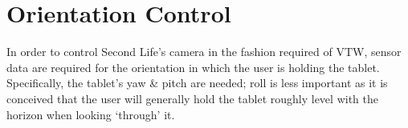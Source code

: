 

\section{Orientation Control}

\label{OrientationControl}

\newcommand{\ArduinoFootnote}{\footnote{\url{http://www.arduino.cc/}}}

\newcommand{\MMAfootnote}{\footnote{\url{http://cache.freescale.com/files/sensors/doc/data_sheet/MMA8452Q.pdf}}}

\newcommand{\ADXLfootnote}{\footnote{\url{http://www.analog.com/static/imported-files/data_sheets/ADXL335.pdf}}}

\newcommand{\HMCfootnote}{\footnote{\url{http://www51.honeywell.com/aero/common/documents/myaerospacecatalog-documents/Defense_Brochures-documents/HMC5883L_3-Axis_Digital_Compass_IC.pdf}}}

\newcommand{\HMCtwoFootnote}{\footnote{\url{http://www51.honeywell.com/aero/common/documents/myaerospacecatalog-documents/Missiles-Munitions/HMC6343.pdf}}}

\newcommand{\vccFootnote}{\footnote{The HMC6343 requires 2.7-3.6V input on VCC/VDD, this wiring showing connection to 5V assumes a HMC6343 breakout with appropriate step down.}}

\newcommand{\itwocFootnote}{\footnote{The HMC6343's I2C lines must be pulled up to 3.3V, this wiring shows connection to an Arduino Uno R3's I2C lines which are pulled up to 5V assuming a HMC6343 breakout with appropriate level shifters.}}



In order to control Second Life's camera in the fashion required of VTW, sensor data are required for the orientation in which the user is holding the tablet. Specifically, the tablet's yaw \& pitch are needed; roll is less important as it is conceived that the user will generally hold the tablet roughly level with the horizon when looking `through' it.

